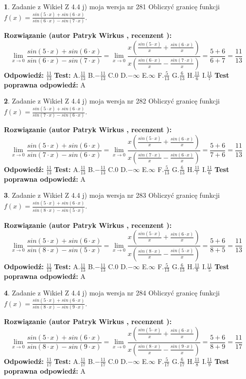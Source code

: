 \documentclass[12pt, a4paper]{article}
\theoremstyle{definition} %
\newtheorem{zad}{}
\newcommand{\zadStart}[1]{\begin{zad}#1\newline}
\newcommand{\zadStop}{\end{zad}}
\newcommand{\rozwStart}[2]{\noindent \textbf{Rozwiązanie (autor #1 , recenzent #2): }\newline}
\newcommand{\rozwStop}{\newline}
\newcommand{\odpStart}{\noindent \textbf{Odpowiedź:}\newline}
\newcommand{\odpStop}{\newline}
\newcommand{\testStart}{\noindent \textbf{Test:}\newline}
\newcommand{\testStop}{\newline}
\newcommand{\kluczStart}{\noindent \textbf{Test poprawna odpowiedź:}\newline}
\newcommand{\kluczStop}{\newline}
\begin{document}
\zadStart{Zadanie z Wikieł Z 4.4 j) moja wersja nr 281}
Obliczyć granicę funkcji $f(x)=\frac{sin(5\cdot x) +sin(6\cdot x)}{sin(6\cdot x) -sin(7\cdot x)}$.
\zadStop
\rozwStart{Patryk Wirkus}{}
$$\lim\limits_{x\to 0}\frac{sin(5\cdot x) +sin(6\cdot x)}{sin(6\cdot x) -sin(7\cdot x)}=\lim\limits_{x\to 0}\frac{x(\frac{sin(5\cdot x)}{x}+\frac{sin(6\cdot x)}{x})}{x(\frac{sin(6\cdot x)}{x}-\frac{sin(7\cdot x)}{x})}=\frac{5+6}{6+7} = \frac{11}{13}$$
\rozwStop
\odpStart
$\frac{11}{13}$
\odpStop
\testStart
A.$\frac{11}{13}$
B.$-\frac{11}{13}$
C.$0$
D.$-\infty$
E.$\infty$
F.$\frac{5}{13}$
G.$\frac{6}{13}$
H.$\frac{11}{6}$
I.$\frac{11}{7}$
\testStop
\kluczStart
A
\kluczStop



\zadStart{Zadanie z Wikieł Z 4.4 j) moja wersja nr 282}
Obliczyć granicę funkcji $f(x)=\frac{sin(5\cdot x) +sin(6\cdot x)}{sin(7\cdot x) -sin(6\cdot x)}$.
\zadStop
\rozwStart{Patryk Wirkus}{}
$$\lim\limits_{x\to 0}\frac{sin(5\cdot x) +sin(6\cdot x)}{sin(7\cdot x) -sin(6\cdot x)}=\lim\limits_{x\to 0}\frac{x(\frac{sin(5\cdot x)}{x}+\frac{sin(6\cdot x)}{x})}{x(\frac{sin(7\cdot x)}{x}-\frac{sin(6\cdot x)}{x})}=\frac{5+6}{7+6} = \frac{11}{13}$$
\rozwStop
\odpStart
$\frac{11}{13}$
\odpStop
\testStart
A.$\frac{11}{13}$
B.$-\frac{11}{13}$
C.$0$
D.$-\infty$
E.$\infty$
F.$\frac{5}{13}$
G.$\frac{6}{13}$
H.$\frac{11}{7}$
I.$\frac{11}{6}$
\testStop
\kluczStart
A
\kluczStop



\zadStart{Zadanie z Wikieł Z 4.4 j) moja wersja nr 283}
Obliczyć granicę funkcji $f(x)=\frac{sin(5\cdot x) +sin(6\cdot x)}{sin(8\cdot x) -sin(5\cdot x)}$.
\zadStop
\rozwStart{Patryk Wirkus}{}
$$\lim\limits_{x\to 0}\frac{sin(5\cdot x) +sin(6\cdot x)}{sin(8\cdot x) -sin(5\cdot x)}=\lim\limits_{x\to 0}\frac{x(\frac{sin(5\cdot x)}{x}+\frac{sin(6\cdot x)}{x})}{x(\frac{sin(8\cdot x)}{x}-\frac{sin(5\cdot x)}{x})}=\frac{5+6}{8+5} = \frac{11}{13}$$
\rozwStop
\odpStart
$\frac{11}{13}$
\odpStop
\testStart
A.$\frac{11}{13}$
B.$-\frac{11}{13}$
C.$0$
D.$-\infty$
E.$\infty$
F.$\frac{5}{13}$
G.$\frac{6}{13}$
H.$\frac{11}{8}$
I.$\frac{11}{5}$
\testStop
\kluczStart
A
\kluczStop



\zadStart{Zadanie z Wikieł Z 4.4 j) moja wersja nr 284}
Obliczyć granicę funkcji $f(x)=\frac{sin(5\cdot x) +sin(6\cdot x)}{sin(8\cdot x) -sin(9\cdot x)}$.
\zadStop
\rozwStart{Patryk Wirkus}{}
$$\lim\limits_{x\to 0}\frac{sin(5\cdot x) +sin(6\cdot x)}{sin(8\cdot x) -sin(9\cdot x)}=\lim\limits_{x\to 0}\frac{x(\frac{sin(5\cdot x)}{x}+\frac{sin(6\cdot x)}{x})}{x(\frac{sin(8\cdot x)}{x}-\frac{sin(9\cdot x)}{x})}=\frac{5+6}{8+9} = \frac{11}{17}$$
\rozwStop
\odpStart
$\frac{11}{17}$
\odpStop
\testStart
A.$\frac{11}{17}$
B.$-\frac{11}{17}$
C.$0$
D.$-\infty$
E.$\infty$
F.$\frac{5}{17}$
G.$\frac{6}{17}$
H.$\frac{11}{8}$
I.$\frac{11}{9}$
\testStop
\kluczStart
A
\kluczStop
\end{document}
